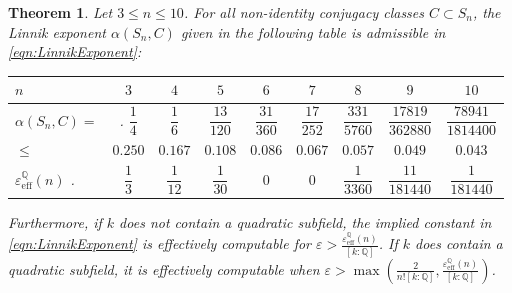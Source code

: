 \documentclass[12pt]{amsart}
\newtheorem{theorem}{Theorem}
\theoremstyle{definition} \newtheorem{definition}[theorem]{Definition}
\theoremstyle{example} \newtheorem{example}[theorem]{Example}
\theoremstyle{remark} \newtheorem{remark}{Remark}[theorem]
\numberwithin{equation}{section}
\numberwithin{theorem}{section}
\renewcommand{\epsilon}{\varepsilon}
\renewcommand{\leq}{\leqslant}
\newcommand{\Q}{\mathbb{Q}}
\begin{document}
	\begin{theorem} 
		\label{thm:small-Sn-intro}
		Let $3 \leq n \leq 10$. For all non-identity conjugacy classes $C \subset S_n$, the Linnik exponent $\alpha(S_n,C)$ given in the following table is  admissible in \eqref{eqn:LinnikExponent}: 
		\begin{center}
			\begin{tabular}{|l|c|c|c|c|c|c|c|c|}
				\hline $n$ & $3$ & $4$ & $5$ & $6$ & $7$ & $8$ & $9$ & $10$ \\
				\hline 
				$\alpha(S_n,C)= $ & \bigg. $\dfrac{1}{4}$ & $\dfrac{1}{6} $ & $\dfrac{13}{120}$ & $\dfrac{31}{360}$ & $\dfrac{17}{252}$ & $\dfrac{331}{5760}$ & $\dfrac{17819}{362880}$ & $\dfrac{78941}{1814400}$ \\
				\hfill $\leq$ & $0.250$ & $0.167$ & $0.108$ & $0.086$ & $0.067$ & $0.057$ & $0.049$ & $0.043$ \\ \hline
				$\epsilon_\mathrm{eff}^\mathbb{Q}(n)$ \bigg. & $\dfrac{1}{3}$ & $\dfrac{1}{12}$ & $\dfrac{1}{30}$ & $0$ & $0$ & $\dfrac{1}{3360}$ & $\dfrac{11}{181440}$ & $\dfrac{1}{181440}$ \\ \hline
			\end{tabular}
		\end{center}
	Furthermore, if $k$ does not contain a quadratic subfield, the implied constant in \eqref{eqn:LinnikExponent} is effectively computable for $\epsilon > \frac{\epsilon_\mathrm{eff}^\mathbb{Q}(n)}{[k:\Q]}$. If $k$ does contain a quadratic subfield, it is effectively computable when $\epsilon > \max\left(\frac{2}{n! [k:\mathbb{Q}]}, \frac{\epsilon_\mathrm{eff}^\mathbb{Q}(n)}{[k:\Q]}\right)$.
	\end{theorem} 
	
\end{document}
